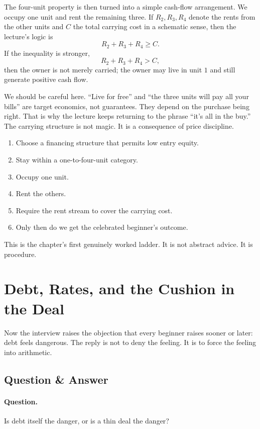 The four-unit property is then turned into a simple cash-flow arrangement. We occupy one unit and rent the remaining three. If $R_2,R_3,R_4$ denote the rents from the other units and $C$ the total carrying cost in a schematic sense, then the lecture's logic is
\begin{equation}
R_2+R_3+R_4 \geq C.
\end{equation}
If the inequality is stronger,
\begin{equation}
R_2+R_3+R_4 > C,
\end{equation}
then the owner is not merely carried; the owner may live in unit $1$ and still generate positive cash flow.

We should be careful here. ``Live for free'' and ``the three units will pay all your bills'' are target economics, not guarantees. They depend on the purchase being right. That is why the lecture keeps returning to the phrase ``it's all in the buy.'' The carrying structure is not magic. It is a consequence of price discipline.

\begin{enumerate}
\item Choose a financing structure that permits low entry equity.
\item Stay within a one-to-four-unit category.
\item Occupy one unit.
\item Rent the others.
\item Require the rent stream to cover the carrying cost.
\item Only then do we get the celebrated beginner's outcome.
\end{enumerate}

This is the chapter's first genuinely worked ladder. It is not abstract advice. It is procedure.

\section{Debt, Rates, and the Cushion in the Deal}

Now the interview raises the objection that every beginner raises sooner or later: debt feels dangerous. The reply is not to deny the feeling. It is to force the feeling into arithmetic.

\subsection{Question \& Answer}

\paragraph{Question.} Is debt itself the danger, or is a thin deal the danger?

